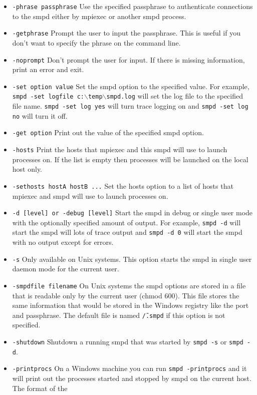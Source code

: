 \documentclass[dvipdfm,11pt]{article}
\begin{document}
\begin{itemize}
\item \texttt{-phrase passphrase}
Use the specified passphrase to authenticate connections to the smpd either by
mpiexec or another smpd process.
\item \texttt{-getphrase}
Prompt the user to input the passphrase.  This is useful if you don't want to 
specify the phrase on the command line.
\item \texttt{-noprompt}
Don't prompt the user for input.  If there is missing information, print an error
and exit.
\item \texttt{-set option value}
Set the smpd option to the specified value.  For example, \texttt{smpd -set logfile c:$\backslash$temp$\backslash$smpd.log} will set the log file to the 
specified file name.  \texttt{smpd -set log yes} will turn trace logging on and
\texttt{smpd -set log no} will turn it off.
\item \texttt{-get option}
Print out the value of the specified smpd option.
\item \texttt{-hosts}
Print the hosts that mpiexec and this smpd will use to launch processes on.  
If the list is empty then processes will be launched on the local host only.
\item \texttt{-sethosts hostA hostB ...}
Set the hosts option to a list of hosts that mpiexec and smpd will use to launch
processes on.
\item \texttt{-d [level] or -debug [level]}
Start the smpd in debug or single user mode with the optionally specified amount
of output.  For example, \texttt{smpd -d} will start the smpd will lots of trace
output and \texttt{smpd -d 0} will start the smpd with no output except for errors.
\item \texttt{-s}
Only available on Unix systems.  This option starts the smpd in single user daemon
mode for the current user.
\item \texttt{-smpdfile filename}
On Unix systems the smpd options are stored in a file that is readable only by
the current user (chmod 600).  This file stores the same information that would
be stored in the Windows registry like the port and passphrase.  The default
file is named \texttt{\~/.smpd} if this option is not specified.
\item \texttt{-shutdown}
Shutdown a running smpd that was started by \texttt{smpd -s} or \texttt{smpd -d}.
\item \texttt{-printprocs}
On a Windows machine you can run \texttt{smpd -printprocs} and it will print out
the processes started and stopped by smpd on the current host.  The format of the

\end{itemize}
\end{document}

